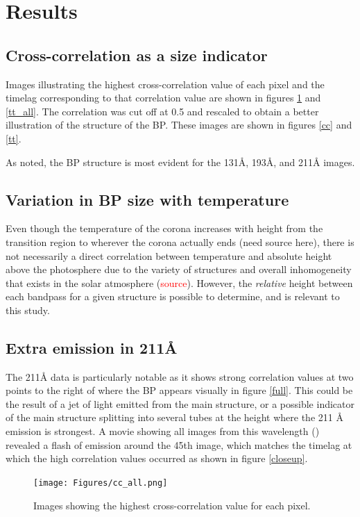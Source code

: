 \documentclass[preprint2]{aastex}
\begin{document}
\section{Results}\label{results}

\subsection{Cross-correlation as a size indicator}
Images illustrating the highest cross-correlation value of each pixel and the
timelag corresponding to that correlation value are shown in figures \ref{cc_all}
and \ref{tt_all}. The correlation was cut off at 0.5 and rescaled to obtain a
better illustration of the structure of the BP. These images are shown in
figures \ref{cc} and \ref{tt}.

As \cite{Alipour} noted, the BP structure is most evident for the
131\AA{}, 193\AA{}, and 211\AA{} images.

\subsection{Variation in BP size with temperature}
Even though the temperature of the corona increases with height from the transition
region to wherever the corona actually ends (need source here), there is not necessarily
a direct correlation between temperature and absolute height above the photosphere
due to the variety of structures
and overall inhomogeneity that exists in the solar atmosphere (\textcolor{red}{source}).
However, the \emph{relative} height between each bandpass for a given structure is
possible to determine, and is relevant to this study.

\subsection{Extra emission in 211\AA{}}
The 211\AA{} data is particularly notable as it shows strong correlation values
at two points to the right of where the BP appears visually in figure \ref{full}.
This could be the result of a jet of light emitted from the main structure, or a
possible indicator of the main structure splitting into several tubes at the
height where the 211 \AA{} emission is strongest.
A movie showing all images from this wavelength (\cite{ssw}) revealed a flash
of emission around the 45th image,
which matches the timelag at which the high correlation values occurred as shown
in figure \ref{closeup}.

\begin{figure}[htb!]
    \texttt{[image: Figures/cc\_all.png]}
    \caption{Images showing the highest cross-correlation value for each pixel. }
    \label{cc_all}
\end{figure}
\end{document}

